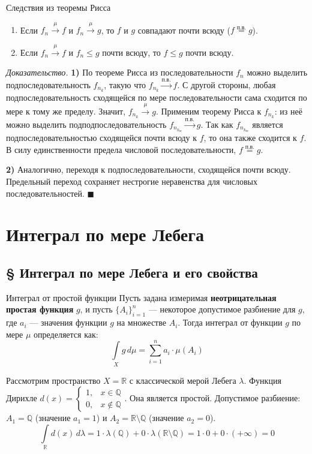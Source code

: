 \documentclass[12pt,a4paper]{article}
\newenvironment{Proof}[1][Доказательство]{\vspace{0.5em}\noindent\textit{#1.}\hspace{0.5em}\ignorespaces}{\hfill$\blacksquare$\vspace{1em}}
\begin{document}
\begin{Theorem}{Следствия из теоремы Рисса}{}
\begin{enumerate}
    \item Если $f_n \xrightarrow{\mu} f$ и $f_n \xrightarrow{\mu} g$, то $f$ и $g$ совпадают почти всюду ($f \stackrel{\text{п.в.}}{=} g$).
    \item Если $f_n \xrightarrow{\mu} f$ и $f_n \le g$ почти всюду, то $f \le g$ почти всюду.
\end{enumerate}
\end{Theorem}

\begin{Proof}
\textbf{1)} По теореме Рисса из последовательности $f_n$ можно выделить подпоследовательность $f_{n_k}$, такую что $f_{n_k} \xrightarrow{\text{п.в.}} f$. 
С другой стороны, любая подпоследовательность сходящейся по мере последовательности сама сходится по мере к тому же пределу. Значит, $f_{n_k} \xrightarrow{\mu} g$. Применим теорему Рисса к $f_{n_k}$: из неё можно выделить подподпоследовательность $f_{n_{k_m}} \xrightarrow{\text{п.в.}} g$. 
Так как $f_{n_{k_m}}$ является подпоследовательностью сходящейся почти всюду к $f$, то она также сходится к $f$. В силу единственности предела числовой последовательности, $f \stackrel{\text{п.в.}}{=} g$.

\textbf{2)} Аналогично, переходя к подпоследовательности, сходящейся почти всюду. Предельный переход сохраняет нестрогие неравенства для числовых последовательностей.
\end{Proof}

\section{Интеграл по мере Лебега}
\subsection{§ Интеграл по мере Лебега и его свойства}

\begin{Definition}{Интеграл от простой функции}{}
Пусть задана измеримая \textbf{неотрицательная простая функция} $g$, и пусть $\{A_i\}_{i=1}^n$ — некоторое допустимое разбиение для $g$, где $a_i$ — значения функции $g$ на множестве $A_i$. Тогда интеграл от функции $g$ по мере $\mu$ определяется как:
$$ \int\limits_X g \, d\mu = \sum\limits_{i=1}^n a_i \cdot \mu(A_i) $$
\end{Definition}

\begin{Example}
Рассмотрим пространство $X = \mathbb{R}$ с классической мерой Лебега $\lambda$.
Функция Дирихле $d(x) = \begin{cases} 1, & x \in \mathbb{Q} \\ 0, & x \notin \mathbb{Q} \end{cases}$.
Она является простой. Допустимое разбиение: $A_1 = \mathbb{Q}$ (значение $a_1 = 1$) и $A_2 = \mathbb{R} \setminus \mathbb{Q}$ (значение $a_2 = 0$).
$$ \int\limits_{\mathbb{R}} d(x) \, d\lambda = 1 \cdot \lambda(\mathbb{Q}) + 0 \cdot \lambda(\mathbb{R} \setminus \mathbb{Q}) = 1 \cdot 0 + 0 \cdot (+\infty) = 0 $$
\end{Example}
\end{document}

